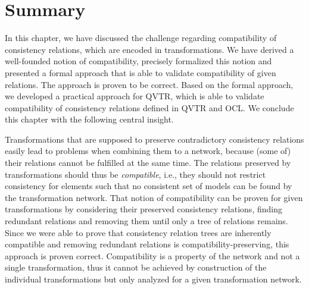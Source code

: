 \section{Summary}

In this chapter, we have discussed the challenge regarding compatibility of consistency relations, which are encoded in transformations.
We have derived a well-founded notion of compatibility, precisely formalized this notion and presented a formal approach that is able to validate compatibility of given relations.
The approach is proven to be correct.
Based on the formal approach, we developed a practical approach for \gls{QVTR}, which is able to validate compatibility of consistency relations defined in \gls{QVTR} and \gls{OCL}.
We conclude this chapter with the following central insight.

\begin{insight}[Compatibility]
    Transformations that are supposed to preserve contradictory consistency relations easily lead to problems when combining them to a network, because (some of) their relations cannot be fulfilled at the same time.
    The relations preserved by transformations should thus be \emph{compatible}, i.e., they should not restrict consistency for elements such that no consistent set of models can be found by the transformation network.
    That notion of compatibility can be proven for given transformations by considering their preserved consistency relations, finding redundant relations and removing them until only a tree of relations remains. Since we were able to prove that consistency relation trees are inherently compatible and removing redundant relations is compatibility-preserving, this approach is proven correct.
    Compatibility is a property of the network and not a single transformation, thus it cannot be achieved by construction of the individual transformations but only analyzed for a given transformation network.
\end{insight}
